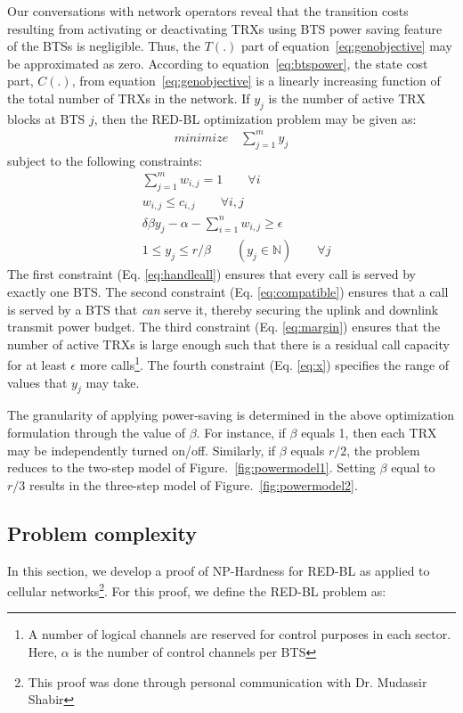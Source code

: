 Our conversations with network operators reveal that the transition costs resulting from activating or deactivating TRXs using BTS power saving feature of the BTSs is negligible. Thus, the $T(.)$ part of equation~\ref{eq:genobjective} may be approximated as zero. According to equation~\ref{eq:btspower}, the state cost part, $C(.)$, from equation~\ref{eq:genobjective} is a linearly increasing function of the total number of TRXs in the network. If $y_j$ is the number of active TRX blocks at BTS $j$, then the RED-BL optimization problem may be given as: 
\begin{align}
\textit{minimize} \quad \sum_{j=1}^{m} y_j
\end{align}
subject to the following constraints: 
\begin{align}
& \sum_{j=1}^m w_{i,j} = 1 \qquad \forall i \label{eq:handleall}\\
& w_{i,j} \leq c_{i,j} \qquad \forall i, j \label{eq:compatible}\\
& \delta \beta y_j - \alpha - \sum_{i=1}^nw_{i,j} \geq \epsilon \label{eq:margin} \\
& 1 \leq y_j \leq r / \beta \qquad (y_j \in \mathbb{N}) \qquad \forall j \label{eq:x}
\end{align}
The first constraint (Eq. \ref{eq:handleall}) ensures that every call is served by exactly one BTS. The second constraint (Eq. \ref{eq:compatible}) ensures that a call is served by a BTS that \textit{can} serve it, thereby securing the uplink and downlink transmit power budget.
The third constraint (Eq. \ref{eq:margin}) ensures that the number of active TRXs is large enough such that there is a residual call capacity for at least $\epsilon$ more calls\footnote{A number of logical channels are reserved for control purposes in each sector. Here, $\alpha$ is the number of control channels per BTS}.
The fourth constraint (Eq. \ref{eq:x}) specifies the range of values that $y_j$ may take.

The granularity of applying power-saving is determined in the above optimization formulation through the value of $\beta$. For instance, if $\beta$ equals 1, then each TRX may be independently turned on/off. Similarly, if $\beta$ equals $r/2$, the problem reduces to the two-step model of Figure.~\ref{fig:powermodel1}. Setting $\beta$ equal to $r/3$ results in the three-step model of Figure.~\ref{fig:powermodel2}.


\subsection{Problem complexity}
\label{subsec:lccomplexity}
In this section, we develop a proof of NP-Hardness for RED-BL as applied to cellular networks\footnote{This proof was done through personal communication with Dr. Mudassir Shabir}. For this proof, we define the RED-BL problem as:
\medskip

